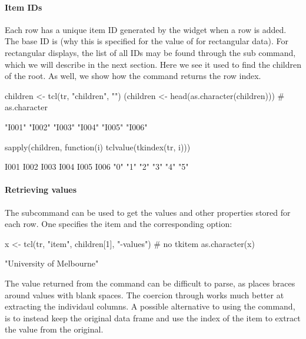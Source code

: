 \paragraph{Item IDs}
Each row has a unique item ID generated by the widget when a row is
added. The base ID is \qcode{} (why this is specified for the value of
 for rectangular data). For rectangular displays, the
list of all IDs may be found through the 
sub command, which we will describe in the next section.  Here we see
it used to find the children of the root. As well, we show how the
 command returns the row index.
\begin{Schunk}
\begin{Sinput}
 children <- tcl(tr, "children", "")
 (children <- head(as.character(children)))     # as.character
\end{Sinput}
\begin{Soutput}
[1] "I001" "I002" "I003" "I004" "I005" "I006"
\end{Soutput}
\begin{Sinput}
 sapply(children, function(i) tclvalue(tkindex(tr, i)))
\end{Sinput}
\begin{Soutput}
I001 I002 I003 I004 I005 I006 
 "0"  "1"  "2"  "3"  "4"  "5" 
\end{Soutput}
\end{Schunk}

\paragraph{Retrieving values}
The  subcommand can be used to get the
values and other properties stored for each row. One specifies the item and the
corresponding option:
\begin{Schunk}
\begin{Sinput}
 x <- tcl(tr, "item", children[1], "-values") # no tkitem
 as.character(x)
\end{Sinput}
\begin{Soutput}
[1] "University of Melbourne"
\end{Soutput}
\end{Schunk}
%
The value returned from the  command can be difficult to
parse, as \TCL\/ places braces around values with blank spaces. The coercion through
 works much better at extracting the individaul
columns. A possible alternative to using the  command, is
to instead keep the original data frame and use the index of the item
to extract the value from the original.

